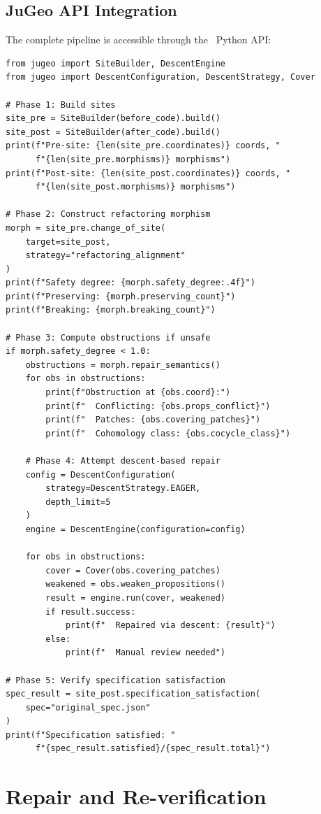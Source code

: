 \documentclass[11pt]{article}
\begin{document}
\subsection{JuGeo API Integration}\label{ssec:api-integration}

The complete pipeline is accessible through the \JuGeo\ Python API:

\begin{lstlisting}[style=jugeo-python]
from jugeo import SiteBuilder, DescentEngine
from jugeo import DescentConfiguration, DescentStrategy, Cover

# Phase 1: Build sites
site_pre = SiteBuilder(before_code).build()
site_post = SiteBuilder(after_code).build()
print(f"Pre-site: {len(site_pre.coordinates)} coords, "
      f"{len(site_pre.morphisms)} morphisms")
print(f"Post-site: {len(site_post.coordinates)} coords, "
      f"{len(site_post.morphisms)} morphisms")

# Phase 2: Construct refactoring morphism
morph = site_pre.change_of_site(
    target=site_post,
    strategy="refactoring_alignment"
)
print(f"Safety degree: {morph.safety_degree:.4f}")
print(f"Preserving: {morph.preserving_count}")
print(f"Breaking: {morph.breaking_count}")

# Phase 3: Compute obstructions if unsafe
if morph.safety_degree < 1.0:
    obstructions = morph.repair_semantics()
    for obs in obstructions:
        print(f"Obstruction at {obs.coord}:")
        print(f"  Conflicting: {obs.props_conflict}")
        print(f"  Patches: {obs.covering_patches}")
        print(f"  Cohomology class: {obs.cocycle_class}")

    # Phase 4: Attempt descent-based repair
    config = DescentConfiguration(
        strategy=DescentStrategy.EAGER,
        depth_limit=5
    )
    engine = DescentEngine(configuration=config)

    for obs in obstructions:
        cover = Cover(obs.covering_patches)
        weakened = obs.weaken_propositions()
        result = engine.run(cover, weakened)
        if result.success:
            print(f"  Repaired via descent: {result}")
        else:
            print(f"  Manual review needed")

# Phase 5: Verify specification satisfaction
spec_result = site_post.specification_satisfaction(
    spec="original_spec.json"
)
print(f"Specification satisfied: "
      f"{spec_result.satisfied}/{spec_result.total}")
\end{lstlisting}

\section{Repair and Re-verification}\label{sec:repair}
\end{document}
